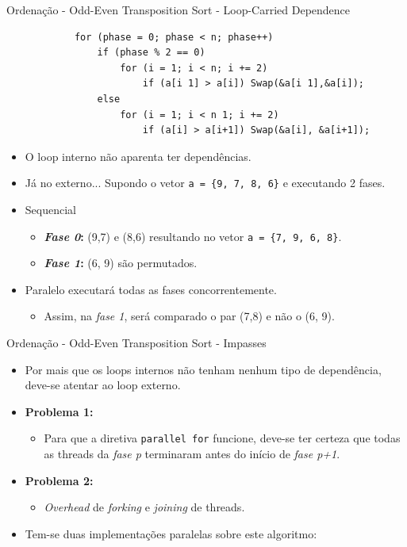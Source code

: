 	\begin{frame}[fragile]{Ordenação - Odd-Even Transposition Sort - Loop-Carried Dependence}
		\begin{verbatim}
			for (phase = 0; phase < n; phase++) 
				if (phase % 2 == 0)
					for (i = 1; i < n; i += 2)
						if (a[i 1] > a[i]) Swap(&a[i 1],&a[i]); 
				else
					for (i = 1; i < n 1; i += 2)
						if (a[i] > a[i+1]) Swap(&a[i], &a[i+1]);
		\end{verbatim}
		\begin{itemize}
			\setlength\itemsep{0.4em}
			\item O loop interno não aparenta ter dependências.
					\bigskip
			\item Já no externo... \pause Supondo o vetor {\tt a = \{9, 7, 8, 6\}} e executando 2 fases.
			\item Sequencial
			\begin{itemize}
				\setlength\itemsep{0.2em}
				\item \textbf{\textit{Fase 0}:} (9,7) e (8,6) resultando no vetor {\tt a = \{7, 9, 6, 8\}}.
				\item \textbf{\textit{Fase 1}:} (6, 9) são permutados.
			\end{itemize}
					\pause
			\item Paralelo executará todas as fases concorrentemente.
			\begin{itemize}
				\item Assim, na \textit{fase 1}, será comparado o par (7,8) e não o (6, 9).
			\end{itemize}
		\end{itemize}
\end{frame}


			
	\begin{frame}{Ordenação - Odd-Even Transposition Sort - Impasses}
		\begin{itemize}
			\setlength\itemsep{1em}
			\item Por mais que os loops internos não tenham nenhum tipo de dependência, deve-se atentar ao loop externo.
			\item \textbf{Problema 1:}
			\begin{itemize}
				\item Para que a diretiva {\tt parallel for} funcione, deve-se ter certeza que todas as threads da \textit{fase p} terminaram antes do início de \textit{fase p+1}.
			\end{itemize}
			\item \textbf{Problema 2:}
			\begin{itemize}
				\item \textit{Overhead} de \textit{forking} e \textit{joining} de threads.
			\end{itemize}

					\bigskip
			\item Tem-se duas implementações paralelas sobre este algoritmo:
		\end{itemize}
	\end{frame}



